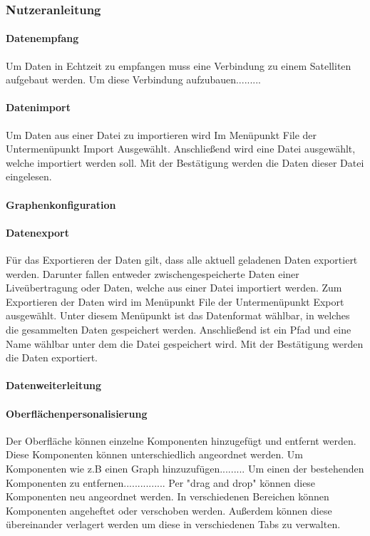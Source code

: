 \subsubsection{Nutzeranleitung}
\paragraph{Datenempfang}
Um Daten in Echtzeit zu empfangen muss eine Verbindung zu einem Satelliten aufgebaut werden. Um diese Verbindung aufzubauen.........
\paragraph{Datenimport}
Um Daten aus einer Datei zu importieren wird Im Menüpunkt File der Untermenüpunkt Import Ausgewählt. Anschließend wird eine Datei ausgewählt, welche importiert werden soll. Mit der Bestätigung werden die Daten dieser Datei eingelesen.
\paragraph{Graphenkonfiguration}
\paragraph{Datenexport}
Für das Exportieren der Daten gilt, dass alle aktuell geladenen Daten exportiert werden. Darunter fallen entweder zwischengespeicherte Daten einer Liveübertragung oder Daten, welche aus einer Datei importiert werden.
Zum Exportieren der Daten wird im Menüpunkt File der Untermenüpunkt Export ausgewählt. Unter diesem Menüpunkt ist das Datenformat wählbar, in welches die gesammelten Daten gespeichert werden. Anschließend ist ein Pfad und eine Name wählbar unter dem die Datei gespeichert wird. Mit der Bestätigung werden die Daten exportiert.
\paragraph{Datenweiterleitung}
\paragraph{Oberflächenpersonalisierung}
Der Oberfläche können einzelne Komponenten hinzugefügt und entfernt werden. Diese Komponenten können unterschiedlich angeordnet werden. Um Komponenten wie z.B einen Graph hinzuzufügen......... Um einen der bestehenden Komponenten zu entfernen............... Per "drag and drop" können diese Komponenten neu angeordnet werden. In verschiedenen Bereichen können Komponenten angeheftet oder verschoben werden. Außerdem können diese übereinander verlagert werden um diese in verschiedenen Tabs zu verwalten.